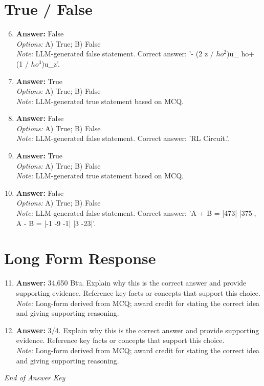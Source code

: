 \documentclass[12pt]{article}
\begin{document}
\section*{True / False}
\begin{enumerate}[label=\arabic*.]
\setcounter{enumi}{5}
\item \textbf{Answer:} False
\\ \textit{Options:} A) True; B) False
\\ \textit{Note:} LLM-generated false statement. Correct answer: '- (2 z / $ho^2$)u\_ ho+ (1 / $ho^3$)u\_z'.
\item \textbf{Answer:} True
\\ \textit{Options:} A) True; B) False
\\ \textit{Note:} LLM-generated true statement based on MCQ.
\item \textbf{Answer:} False
\\ \textit{Options:} A) True; B) False
\\ \textit{Note:} LLM-generated false statement. Correct answer: 'RL Circuit.'.
\item \textbf{Answer:} True
\\ \textit{Options:} A) True; B) False
\\ \textit{Note:} LLM-generated true statement based on MCQ.
\item \textbf{Answer:} False
\\ \textit{Options:} A) True; B) False
\\ \textit{Note:} LLM-generated false statement. Correct answer: 'A + B = |473| |375|, A - B = |-1 -9 -1| |3 -23|'.
\end{enumerate}

\section*{Long Form Response}
\begin{enumerate}[label=\arabic*.]
\setcounter{enumi}{10}
\item \textbf{Answer:} 34,650 Btu. Explain why this is the correct answer and provide supporting evidence. Reference key facts or concepts that support this choice.
\\ \textit{Note:} Long-form derived from MCQ; award credit for stating the correct idea and giving supporting reasoning.
\item \textbf{Answer:} 3/4. Explain why this is the correct answer and provide supporting evidence. Reference key facts or concepts that support this choice.
\\ \textit{Note:} Long-form derived from MCQ; award credit for stating the correct idea and giving supporting reasoning.
\end{enumerate}

\vfill
\noindent\textit{End of Answer Key}
\end{document}
